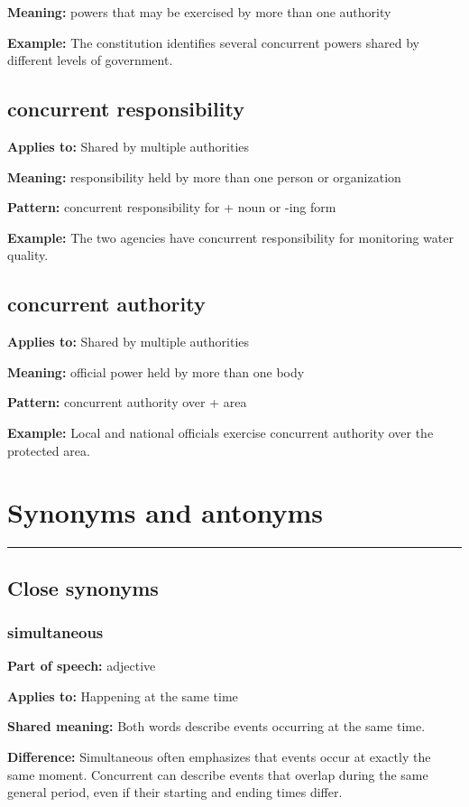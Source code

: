 \documentclass[11pt]{article}
\newcommand{\sectionrule}{\par\vspace{-0.5em}\noindent\textcolor{Accent}{\rule{\linewidth}{0.6pt}}\par}
\begin{document}
\textbf{Meaning:} powers that may be exercised by more than one authority

\textbf{Example:} The constitution identifies several concurrent powers shared by different levels of government.

\subsection{concurrent responsibility}
\textbf{Applies to:} Shared by multiple authorities

\textbf{Meaning:} responsibility held by more than one person or organization

\textbf{Pattern:} concurrent responsibility for + noun or -ing form

\textbf{Example:} The two agencies have concurrent responsibility for monitoring water quality.

\subsection{concurrent authority}
\textbf{Applies to:} Shared by multiple authorities

\textbf{Meaning:} official power held by more than one body

\textbf{Pattern:} concurrent authority over + area

\textbf{Example:} Local and national officials exercise concurrent authority over the protected area.

\section{Synonyms and antonyms}
\sectionrule
\subsection{Close synonyms}
\subsubsection{simultaneous}
\textbf{Part of speech:} adjective

\textbf{Applies to:} Happening at the same time

\textbf{Shared meaning:} Both words describe events occurring at the same time.

\textbf{Difference:} Simultaneous often emphasizes that events occur at exactly the same moment. Concurrent can describe events that overlap during the same general period, even if their starting and ending times differ.
\end{document}
